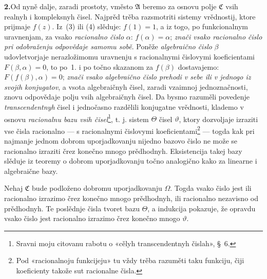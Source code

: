 \documentclass[11pt]{article}
\providecommand{\Afield}{\mathfrak A}
\providecommand{\Cfield}{\mathfrak C}
\begin{document}

\medskip
\noindent\textbf{2.}\quad Od nyně dalje, zaradi prostoty, vměsto \(\Afield\) beremo za osnovu polje \(\Cfield\) vsih realnyh i kompleksnyh čisel. Najprěd trěba razsmotriti sistemy vrědnostij, ktore prijmaje \(f(z)\). Iz~(3) ili (4) slěduje: \(f(1)=1\), a iz togo, po funkcionalnym uravnenjam, za vsako {\itshape racionalno čislo} \(\alpha\): \(f(\alpha)=\alpha\); {\itshape znači vsako racionalno čislo pri odobraženju odpovědaje samomu sobě}. Poněže {\itshape algebraično čislo} \(\beta\) udovletvorjaje nerazložimomu uravnenju s racionalnymi čislovymi koeficientami \(F(\beta,\alpha)=0\), to po~1. i po točno skazanom za \(f(\beta)\) dostavajemo: \(F(f(\beta),\alpha)=0\); {\itshape znači vsako algebraično čislo prehodi v sebe ili v jednogo iz svojih konjugatov}, a vsota algebraičnyh čisel, zaradi vzaimnoj jednoznačnosti, znovu odpovědaje polju vsih algebraičnyh čisel. Da bysmo razuměli povedenje {\itshape transcendentnyh} čisel i jednočasno razdělili konjugatne vrědnosti, klademo v osnovu {\itshape racionalnu bazu vsih čisel}\footnote{Sravni moju citovanu rabotu o «cělyh transcendentnyh čislah», \S\ 6.}, t. j. sistem \(\Theta\) čisel \(\vartheta\), ktory dozvoljaje izraziti vse čisla racionalno --- s racionalnymi čislovymi koeficientami\footnote{Pod «racionalnoju funkcijeju» tu vždy trěba razuměti taku funkciju, čiji koeficienty takože sut racionalne čisla.} --- togda kak pri najmanje jednom dobrom uporjadkovanju nijedno bazovo čislo ne može se racionalno izraziti črez konečno mnogo prědhodnyh. Eksistencija takej bazy slěduje iz teoremy o dobrom uporjadkovanju točno analogično kako za linearne i algebraične bazy.

Nehaj \(\Cfield\) bude podloženo dobromu uporjadkovanju \(\Omega\). Togda vsako čislo jest ili racionalno izrazimo črez konečno mnogo prědhodnyh, ili racionalno nezavisno od prědhodnyh. Te poslědnje čisla tvoret bazu \(\Theta\), a indukcija pokazuje, že opravdu vsako čislo jest racionalno izrazimo črez konečno mnogo \(\vartheta\).
\end{document}
